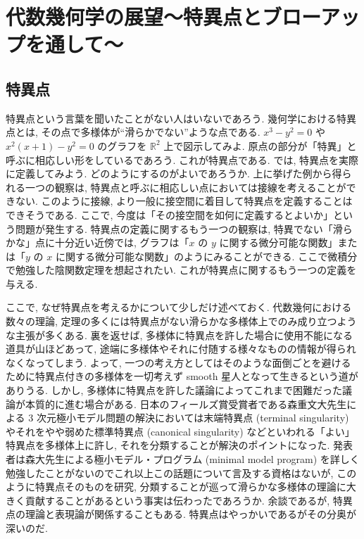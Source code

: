 \documentclass[openany, a4paper, oneside]{jsbook}
\theoremstyle{break}
\theoremstyle{breakdefn}
\begin{document}
\section{代数幾何学の展望〜特異点とブローアップを通して〜}

\subsection{特異点}


特異点という言葉を聞いたことがない人はいないであろう.
幾何学における特異点とは, その点で多様体が``滑らかでない''ような点である.
$x^3-y^2=0$ や $x^2 (x+1)-y^2=0$ のグラフを $\mathbb{R}^2$ 上で図示してみよ.
原点の部分が「特異」と呼ぶに相応しい形をしているであろう.
これが特異点である.
では, 特異点を実際に定義してみよう.
どのようにするのがよいであろうか.
上に挙げた例から得られる一つの観察は, 特異点と呼ぶに相応しい点においては接線を考えることができない.
このように接線, より一般に接空間に着目して特異点を定義することはできそうである.
ここで, 今度は「その接空間を如何に定義するとよいか」という問題が発生する.
特異点の定義に関するもう一つの観察は, 特異でない「滑らかな」点に十分近い近傍では,
グラフは「$x$ の $y$ に関する微分可能な関数」または「$y$ の $x$ に関する微分可能な関数」のようにみることができる.
ここで微積分で勉強した陰関数定理を想起されたい.
これが特異点に関するもう一つの定義を与える.

ここで, なぜ特異点を考えるかについて少しだけ述べておく.
代数幾何における数々の理論, 定理の多くには特異点がない滑らかな多様体上でのみ成り立つような主張が多くある.
裏を返せば, 多様体に特異点を許した場合に使用不能になる道具が山ほどあって,
途端に多様体やそれに付随する様々なものの情報が得られなくなってしまう.
よって, 一つの考え方としてはそのような面倒ごとを避けるために特異点付きの多様体を一切考えず smooth 星人となって生きるという道がありうる.
しかし, 多様体に特異点を許した議論によってこれまで困難だった議論が本質的に進む場合がある.
日本のフィールズ賞受賞者である森重文大先生による 3 次元極小モデル問題の解決においては末端特異点 (terminal singularity)
やそれをやや弱めた標準特異点 (canonical singularity) などといわれる「よい」特異点を多様体上に許し,
それを分類することが解決のポイントになった.
発表者は森大先生による極小モデル・プログラム (minimal model program) を詳しく勉強したことがないのでこれ以上この話題について言及する資格はないが,
このように特異点そのものを研究, 分類することが巡って滑らかな多様体の理論に大きく貢献することがあるという事実は伝わったであろうか.
余談であるが, 特異点の理論と表現論が関係することもある.
特異点はやっかいであるがその分奥が深いのだ.
\end{document}
